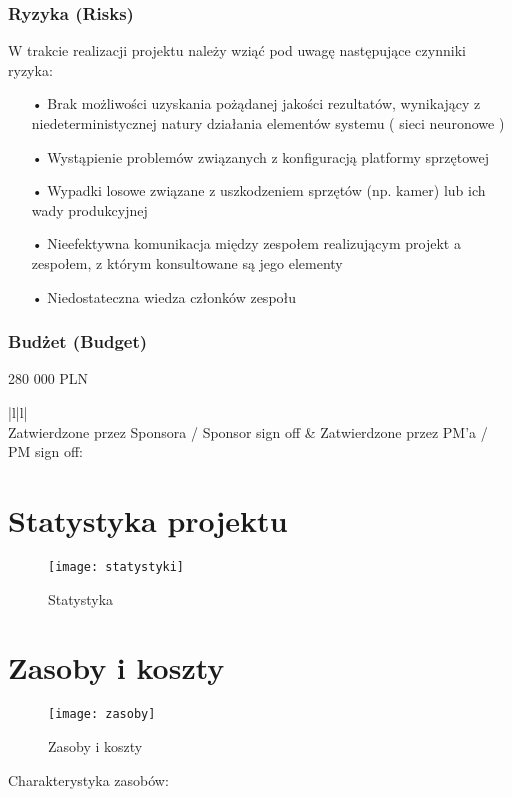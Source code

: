 \subsection{Ryzyka (Risks)}
W trakcie realizacji projektu należy wziąć pod uwagę następujące czynniki ryzyka:
\begin{itemize}
\item[•] Brak możliwości uzyskania pożądanej jakości rezultatów, wynikający z niedeterministycznej natury działania elementów systemu ( sieci neuronowe )
\item[•] Wystąpienie problemów związanych z konfiguracją platformy sprzętowej
\item[•] Wypadki losowe związane z uszkodzeniem sprzętów (np. kamer) lub ich wady produkcyjnej  
\item[•] Nieefektywna komunikacja między zespołem realizującym projekt a zespołem, z którym konsultowane są jego elementy
\item[•] Niedostateczna wiedza członków zespołu
\end{itemize}
\subsection{Budżet (Budget)}
280 000 PLN\newline
\begin{tabular}{ |l|l| }
\hline
{} \\
\hline
Zatwierdzone przez Sponsora / Sponsor sign off & Zatwierdzone przez PM’a / PM sign off: \\ \hline
\end{tabular}
\chapter{Statystyka projektu}
\begin{figure}[H]
\centering
  \texttt{[image: statystyki]}
  \caption{Statystyka}
\end{figure}
\chapter{Zasoby i koszty}
\begin{figure}[H]
\centering
  \texttt{[image: zasoby]}
  \caption{Zasoby i koszty}
  \label{zasoby}
\end{figure}
\newpage
Charakterystyka zasobów:

